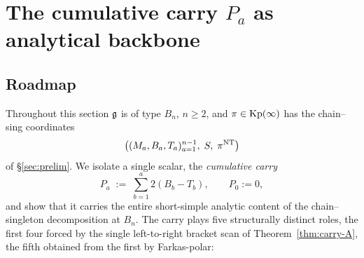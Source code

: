 %
%
%
%

\section{The cumulative carry $P_a$ as analytical backbone}\label{sec:carry}

\subsection{Roadmap}\label{ssec:carry-roadmap}

Throughout this section $\mathfrak{g}$ is of type $B_n$, $n \ge 2$, and $\pi \in \mathrm{Kp}(\infty)$
has the chain--sing coordinates
\[
   \bigl((M_a, B_a, T_a)_{a=1}^{n-1},\; S,\; \pi^{\mathrm{NT}}\bigr)
\]
of \S\ref{sec:prelim}. We isolate a single scalar, the \emph{cumulative carry}
\[
   P_a \;:=\; \sum_{b=1}^{a} 2(B_b - T_b), \qquad P_0 := 0,
\]
and show that it carries the entire short-simple analytic content of the
chain--singleton decomposition at $B_n$. The carry plays five structurally
distinct roles, the first four forced by the single left-to-right bracket scan
of Theorem~\ref{thm:carry-A}, the fifth obtained from the first by Farkas-polar:

